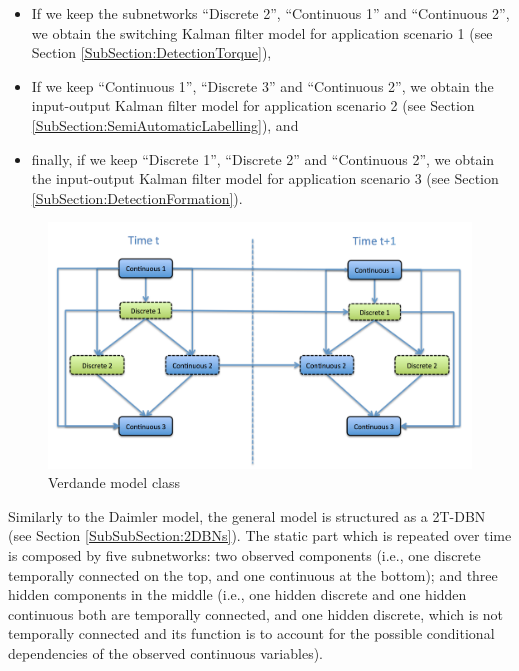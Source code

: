 \begin{itemize}
\item If we keep the subnetworks ``Discrete 2'', ``Continuous 1'' and ``Continuous 2'', we obtain the switching Kalman filter model for application scenario 1 (see Section \ref{SubSection:DetectionTorque}),
\item If we keep ``Continuous 1'', ``Discrete 3'' and ``Continuous 2'', we obtain the input-output Kalman filter model for application scenario 2 (see Section \ref{SubSection:SemiAutomaticLabelling}), and
\item finally, if we keep ``Discrete 1'', ``Discrete 2'' and ``Continuous 2'', we obtain the input-output Kalman filter model for application scenario 3  (see Section \ref{SubSection:DetectionFormation}).
\end{itemize}

\begin{figure}[ht!]
\begin{center}
\includegraphics[scale=0.4]{./figures/VerdandeModelClass}
\caption{\label{Figure:VerdandeModelClass} Verdande model class}
\end{center}
\end{figure}

Similarly to the Daimler model, the general model is structured as a 2T-DBN (see Section \ref{SubSubSection:2DBNs}). The static part which is repeated over time is composed by five subnetworks: two observed components (i.e., one discrete temporally connected on the top, and one continuous at the bottom); and three hidden components in the middle (i.e., one hidden discrete and one hidden continuous both are temporally connected, and one hidden discrete, which is not temporally connected and its function is to account for the possible conditional dependencies of the observed continuous variables).  

